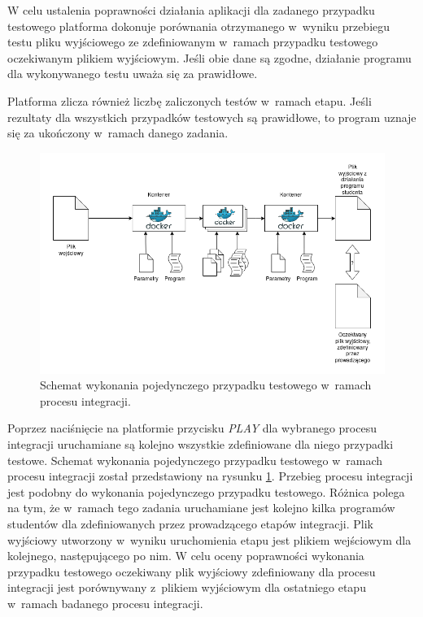 W celu ustalenia poprawności działania aplikacji dla zadanego przypadku testowego platforma dokonuje porównania otrzymanego w~wyniku przebiegu testu pliku wyjściowego ze zdefiniowanym w~ramach przypadku testowego oczekiwanym plikiem wyjściowym.
Jeśli obie dane są zgodne, działanie programu dla wykonywanego testu uważa się za prawidłowe.

Platforma zlicza również liczbę zaliczonych testów w~ramach etapu.
Jeśli rezultaty dla wszystkich przypadków testowych są prawidłowe, to program uznaje się za ukończony w~ramach danego zadania.

\begin{figure}[h]
    \centering
    \includegraphics[width = 12cm]{chapter05/integration.png}
    \caption{Schemat wykonania pojedynczego przypadku testowego w~ramach procesu integracji.}
    \label{fig:integration}
\end{figure}

Poprzez naciśnięcie na platformie przycisku \textit{PLAY} dla wybranego procesu integracji uruchamiane są kolejno wszystkie zdefiniowane dla niego przypadki testowe.
Schemat wykonania pojedynczego przypadku testowego w~ramach procesu integracji został przedstawiony na rysunku \ref{fig:integration}.
Przebieg procesu integracji jest podobny do wykonania pojedynczego przypadku testowego.
Różnica polega na tym, że w~ramach tego zadania uruchamiane jest kolejno kilka programów studentów dla zdefiniowanych przez prowadzącego etapów integracji.
Plik wyjściowy utworzony w~wyniku uruchomienia etapu jest plikiem wejściowym dla kolejnego, następującego po nim.
W celu oceny poprawności wykonania przypadku testowego oczekiwany plik wyjściowy zdefiniowany dla procesu integracji jest porównywany z~plikiem wyjściowym dla ostatniego etapu w~ramach badanego procesu integracji.

